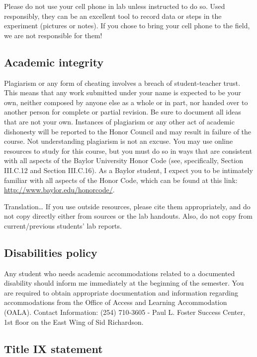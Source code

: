 \documentclass[11pt,]{article}
\begin{document}
Please do not use your cell phone in lab unless instructed to do so.
Used responsibly, they can be an excellent tool to record data or steps
in the experiment (pictures or notes). If you chose to bring your cell
phone to the field, we are not responsible for them!

\subsection{Academic integrity}\label{academic-integrity}

Plagiarism or any form of cheating involves a breach of student-teacher
trust. This means that any work submitted under your name is expected to
be your own, neither composed by anyone else as a whole or in part, nor
handed over to another person for complete or partial revision. Be sure
to document all ideas that are not your own. Instances of plagiarism or
any other act of academic dishonesty will be reported to the Honor
Council and may result in failure of the course. Not understanding
plagiarism is not an excuse. You may use online resources to study for
this course, but you must do so in ways that are consistent with all
aspects of the Baylor University Honor Code (see, specifically, Section
III.C.12 and Section III.C.16). As a Baylor student, I expect you to be
intimately familiar with all aspects of the Honor Code, which can be
found at this link: \url{http://www.baylor.edu/honorcode/}.

Translation\ldots{} If you use outside resources, please cite them
appropriately, and do not copy directly either from sources or the lab
handouts. Also, do not copy from current/previous students' lab reports.

\subsection{Disabilities policy}\label{disabilities-policy}

Any student who needs academic accommodations related to a documented
disability should inform me immediately at the beginning of the
semester. You are required to obtain appropriate documentation and
information regarding accommodations from the Office of Access and
Learning Accommodation (OALA). Contact Information: (254) 710-3605 -
Paul L. Foster Success Center, 1st floor on the East Wing of Sid
Richardson.

\subsection{Title IX statement}\label{title-ix-statement}
\end{document}
